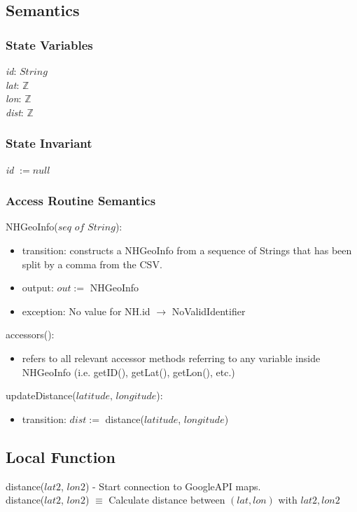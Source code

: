 \documentclass[12pt]{article}
\begin{document}
\subsection* {Semantics}

\subsubsection* {State Variables}
\textit{id}: $String$\\
\textit{lat}: $\mathbb{Z}$\\
\textit{lon}: $\mathbb{Z}$\\
\textit{dist}: $\mathbb{Z}$

\subsubsection* {State Invariant}

\textit{id} $:= null$


\subsubsection* {Access Routine Semantics}

NHGeoInfo($\textit{seq of String}$):
\begin{itemize}
\item transition: constructs a NHGeoInfo from a sequence of Strings that has been split by a comma from the CSV.
\item output: $out := $ NHGeoInfo
\item exception: No value for NH.id $\rightarrow$ NoValidIdentifier
\end{itemize}

\noindent accessors():
\begin{itemize}
\item refers to all relevant accessor methods referring to any variable inside NHGeoInfo (i.e. getID(), getLat(), getLon(), etc.)
\end{itemize}

\noindent updateDistance($\textit{latitude, longitude}$):
\begin{itemize}
\item transition: $dist := $ distance($latitude$, $longitude$)
\end{itemize}

\subsection*{Local Function}
\noindent distance($lat2$, $lon2$) - Start connection to GoogleAPI maps. \\
\noindent distance($lat2$, $lon2$) $ \equiv $ Calculate distance between $(lat, lon)$ with $lat2, lon2$
\end{document}
